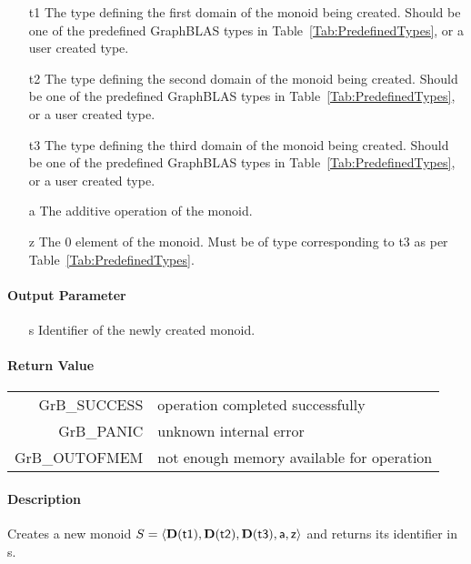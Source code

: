 \begin{itemize}
	\item[{\sf t1}] The type defining the first domain of the monoid being created. Should be one of the predefined
	GraphBLAS types in Table~\ref{Tab:PredefinedTypes}, or a user created type.
	\item[{\sf t2}] The type defining the second domain of the monoid being created. Should be one of the predefined
	GraphBLAS types in Table~\ref{Tab:PredefinedTypes}, or a user created type.
	\item[{\sf t3}] The type defining the third domain of the monoid being created. Should be one of the predefined
	GraphBLAS types in Table~\ref{Tab:PredefinedTypes}, or a user created type.
	\item[{\sf a}] The additive operation of the monoid.
	\item[{\sf z}] The $0$ element of the monoid. Must be of type corresponding to {\sf t3} as per Table~\ref{Tab:PredefinedTypes}.
\end{itemize}

\paragraph{Output Parameter}

\begin{itemize}
	\item[{\sf s}] Identifier of the newly created monoid.
\end{itemize}

\paragraph{Return Value}

\begin{tabular}{rl} 
{\sf GrB\_SUCCESS} 	& operation completed successfully \\
{\sf GrB\_PANIC}	& unknown internal error \\
{\sf GrB\_OUTOFMEM}	& not enough memory available for operation \\
\end{tabular}

\paragraph{Description}

Creates a new monoid $S = \langle \bold{D}({\sf t1}), \bold{D}({\sf t2}), \bold{D}({\sf t3}), {\sf a}, {\sf z} \rangle$ and
returns its identifier in {\sf s}.


